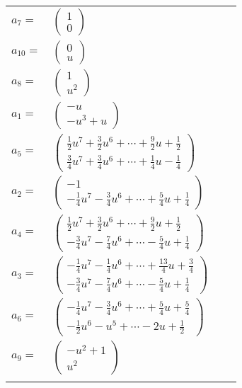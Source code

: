 \documentclass[1p]{elsarticle_modified}
\theoremstyle{definition}
\begin{document}
\begin{tabular}{m{7pt} m{180pt} m{7pt} m{180pt} }
\flushright $a_{7}=$&$\begin{pmatrix}1\\0\end{pmatrix}$ \\
\flushright $a_{10}=$&$\begin{pmatrix}0\\u\end{pmatrix}$ \\
\flushright $a_{8}=$&$\begin{pmatrix}1\\u^2\end{pmatrix}$ \\
\flushright $a_{1}=$&$\begin{pmatrix}- u\\- u^3+u\end{pmatrix}$ \\
\flushright $a_{5}=$&$\begin{pmatrix}\frac{1}{2} u^7+\frac{3}{2} u^6+\cdots+\frac{9}{2} u+\frac{1}{2}\\\frac{3}{4} u^7+\frac{3}{4} u^6+\cdots+\frac{1}{4} u-\frac{1}{4}\end{pmatrix}$ \\
\flushright $a_{2}=$&$\begin{pmatrix}-1\\-\frac{1}{4} u^7-\frac{3}{4} u^6+\cdots+\frac{5}{4} u+\frac{1}{4}\end{pmatrix}$ \\
\flushright $a_{4}=$&$\begin{pmatrix}\frac{1}{2} u^7+\frac{3}{2} u^6+\cdots+\frac{9}{2} u+\frac{1}{2}\\-\frac{3}{4} u^7-\frac{7}{4} u^6+\cdots-\frac{5}{4} u+\frac{1}{4}\end{pmatrix}$ \\
\flushright $a_{3}=$&$\begin{pmatrix}-\frac{1}{4} u^7-\frac{1}{4} u^6+\cdots+\frac{13}{4} u+\frac{3}{4}\\-\frac{3}{4} u^7-\frac{7}{4} u^6+\cdots-\frac{5}{4} u+\frac{1}{4}\end{pmatrix}$ \\
\flushright $a_{6}=$&$\begin{pmatrix}-\frac{1}{4} u^7-\frac{3}{4} u^6+\cdots+\frac{5}{4} u+\frac{5}{4}\\-\frac{1}{2} u^6- u^5+\cdots-2 u+\frac{1}{2}\end{pmatrix}$ \\
\flushright $a_{9}=$&$\begin{pmatrix}- u^2+1\\u^2\end{pmatrix}$\\&\end{tabular}
\end{document}
